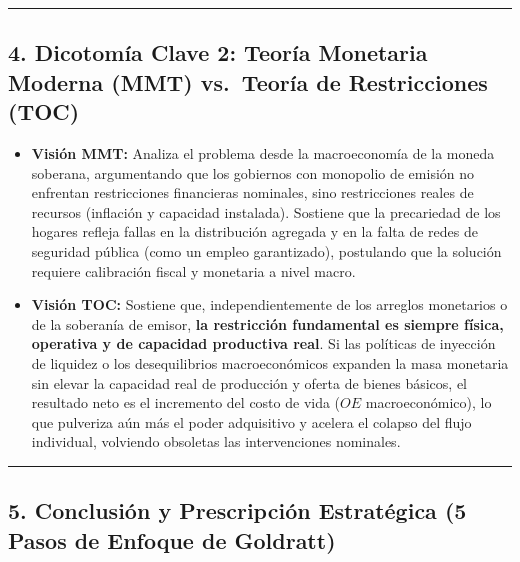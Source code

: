 \documentclass[12pt,letterpaper]{article}
\providecommand{\tightlist}{%
  \setlength{\itemsep}{0pt}\setlength{\parskip}{0pt}}
\begin{document}
\begin{center}\rule{0.5\linewidth}{0.5pt}\end{center}

\hypertarget{dicotomuxeda-clave-2-teoruxeda-monetaria-moderna-mmt-vs.-teoruxeda-de-restricciones-toc}{%
\subsection{4. Dicotomía Clave 2: Teoría Monetaria Moderna (MMT)
vs.~Teoría de Restricciones
(TOC)}\label{dicotomuxeda-clave-2-teoruxeda-monetaria-moderna-mmt-vs.-teoruxeda-de-restricciones-toc}}

\begin{itemize}
\tightlist
\item
  \textbf{Visión MMT:} Analiza el problema desde la macroeconomía de la
  moneda soberana, argumentando que los gobiernos con monopolio de
  emisión no enfrentan restricciones financieras nominales, sino
  restricciones reales de recursos (inflación y capacidad instalada).
  Sostiene que la precariedad de los hogares refleja fallas en la
  distribución agregada y en la falta de redes de seguridad pública
  (como un empleo garantizado), postulando que la solución requiere
  calibración fiscal y monetaria a nivel macro.
\item
  \textbf{Visión TOC:} Sostiene que, independientemente de los arreglos
  monetarios o de la soberanía de emisor, \textbf{la restricción
  fundamental es siempre física, operativa y de capacidad productiva
  real}. Si las políticas de inyección de liquidez o los desequilibrios
  macroeconómicos expanden la masa monetaria sin elevar la capacidad
  real de producción y oferta de bienes básicos, el resultado neto es el
  incremento del costo de vida (\(OE\) macroeconómico), lo que pulveriza
  aún más el poder adquisitivo y acelera el colapso del flujo
  individual, volviendo obsoletas las intervenciones nominales.
\end{itemize}

\begin{center}\rule{0.5\linewidth}{0.5pt}\end{center}

\hypertarget{conclusiuxf3n-y-prescripciuxf3n-estratuxe9gica-5-pasos-de-enfoque-de-goldratt}{%
\subsection{5. Conclusión y Prescripción Estratégica (5 Pasos de Enfoque
de
Goldratt)}\label{conclusiuxf3n-y-prescripciuxf3n-estratuxe9gica-5-pasos-de-enfoque-de-goldratt}}
\end{document}
